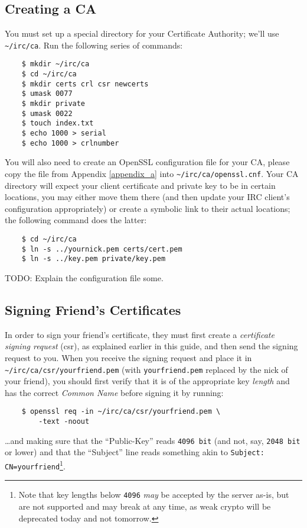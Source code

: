 \documentclass{article}
\begin{document}
{\subsection{Creating a CA}
You must set up a special directory for your Certificate Authority; we'll use \texttt{\textasciitilde /irc/ca}.  Run the following series of commands:
\begin{lstlisting}
    $ mkdir ~/irc/ca
    $ cd ~/irc/ca
    $ mkdir certs crl csr newcerts
    $ umask 0077
    $ mkdir private
    $ umask 0022
    $ touch index.txt
    $ echo 1000 > serial
    $ echo 1000 > crlnumber
\end{lstlisting}
You will also need to create an OpenSSL configuration file for your CA, please copy the file from Appendix \ref{appendix_a} into \texttt{\textasciitilde /irc/ca/openssl.cnf}.  Your CA directory will expect your client certificate and private key to be in certain locations, you may either move them there (and then update your IRC client's configuration appropriately) or create a symbolic link to their actual locations; the following command does the latter:
\begin{lstlisting}
    $ cd ~/irc/ca
    $ ln -s ../yournick.pem certs/cert.pem
    $ ln -s ../key.pem private/key.pem
\end{lstlisting}
TODO: Explain the configuration file some.

\subsection{Signing Friend's Certificates}
In order to sign your friend's certificate, they must first create a \textit{certificate signing request} (csr), as explained earlier in this guide, and then send the signing request to you.  When you receive the signing request and place it in \texttt{\textasciitilde /irc/ca/csr/yourfriend.pem} (with \texttt{yourfriend.pem} replaced by the nick of your friend), you should first verify that it is of the appropriate key \textit{length} and has the correct \textit{Common Name} before signing it by running:
\begin{lstlisting}
    $ openssl req -in ~/irc/ca/csr/yourfriend.pem \
        -text -noout
\end{lstlisting}
\ldots and making sure that the ``Public-Key'' reads \texttt{4096 bit} (and not, say, \texttt{2048 bit} or lower) and that the ``Subject'' line reads something akin to \texttt{Subject: CN=yourfriend}\footnote{Note that key lengths below \texttt{4096} \textit{may} be accepted by the server as-is, but are not supported and may break at any time, as weak crypto will be deprecated today and not tomorrow.}.

}
\end{document}
